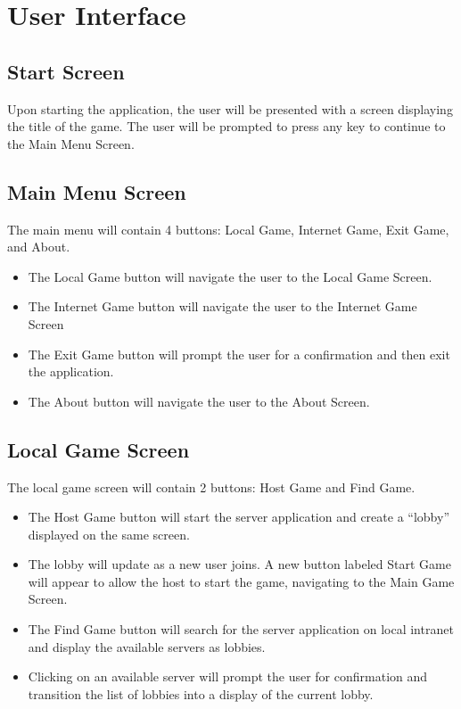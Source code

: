 \section{User Interface}

\subsection{Start Screen}
Upon starting the application, the user will be presented with a screen
displaying the title of the game.  The user will be prompted to press any key
to continue to the Main Menu Screen.

\subsection{Main Menu Screen}
The main menu will contain 4 buttons: Local Game, Internet Game, Exit Game, and
About.
\begin{itemize}
  \item The Local Game button will navigate the user to the Local Game Screen.
  \item The Internet Game button will navigate the user to the Internet Game Screen
  \item The Exit Game button will prompt the user for a confirmation and then exit the application.
  \item The About button will navigate the user to the About Screen.
\end{itemize}

\subsection{Local Game Screen}\label{subsec:local-game-screen}
The local game screen will contain 2 buttons: Host Game and Find Game.
\begin{itemize}
  \item
    The Host Game button will start the server application and create a
    ``lobby'' displayed on the same screen.
  \item
    The lobby will update as a new user joins. A new button labeled Start Game
    will appear to allow the host to start the game, navigating to the Main
    Game Screen.
  \item
    The Find Game button will search for the server application on local
    intranet and display the available servers as lobbies.
  \item
    Clicking on an available server will prompt the user for confirmation and
    transition the list of lobbies into a display of the current lobby.
\end{itemize}

